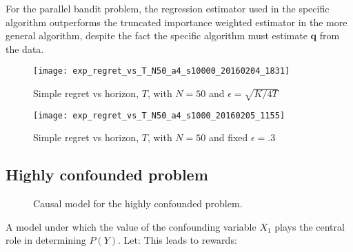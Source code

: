For the parallel bandit problem, the regression estimator used in the specific algorithm outperforms the truncated importance weighted estimator in the more general algorithm, despite the fact the specific algorithm must estimate $\boldsymbol{q}$ from the data. 

\begin{figure}
\caption{Simple regret vs horizon, $T$, with $N = 50$ and $\epsilon = \sqrt{K/4T}$}
\label{fig:simple_vs_T_vary_epsilon}
\centering
\texttt{[image: exp\_regret\_vs\_T\_N50\_a4\_s10000\_20160204\_1831]}
\end{figure}

\begin{figure}
\caption{Simple regret vs horizon, $T$, with $N = 50$ and fixed $\epsilon = .3$}
\label{fig:simple_vs_T}
\centering
\texttt{[image: exp\_regret\_vs\_T\_N50\_a4\_s1000\_20160205\_1155]}
\end{figure}


\subsection{Highly confounded problem}

 
\begin{figure}[h]
\centering
\caption{Causal model for the highly confounded problem.}
\label{fig:causalStructure_highly_confounded}
\end{figure}


A model under which the value of the confounding variable $X_1$ plays the central role in determining $P(Y)$.  Let:
This leads to rewards:



